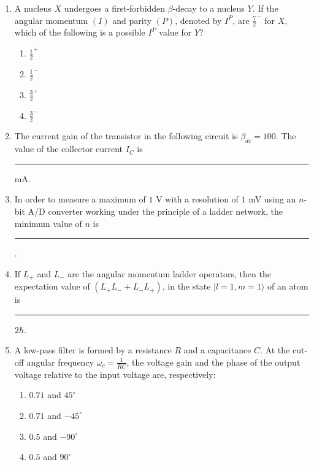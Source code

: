 \documentclass[journal]{IEEEtran}
\begin{document}
\begin{enumerate}
    
    \item A nucleus $X$ undergoes a first-forbidden $\beta$-decay to a nucleus $Y$. If the angular momentum $(I)$ and parity $(P)$, denoted by $I^P$, are $\frac{7}{2}^-$ for $X$, which of the following is a possible $I^P$ value for $Y$?
    
    \begin{multicols}{4}
    \begin{enumerate}
        \item $\frac{1}{2}^+$
        \item $\frac{1}{2}^-$
        \item $\frac{3}{2}^+$
        \item $\frac{3}{2}^-$
    \end{enumerate}
    \end{multicols}

        
    \item The current gain of the transistor in the following circuit is $\beta_{dc} = 100$. The value of the collector current $I_C$ is \rule{1cm}{0.15mm} mA.

    

    
    \item In order to measure a maximum of $1$ V with a resolution of $1$ mV using an $n$-bit A/D converter working under the principle of a ladder network, the minimum value of $n$ is \rule{1cm}{0.15mm}.

    
    \item If $L_+$ and $L_-$ are the angular momentum ladder operators, then the expectation value of $(L_+ L_- + L_- L_+)$, in the state $|l=1, m=1\rangle$ of an atom is \rule{1cm}{0.15mm} $2\hbar$.

    
    \item A low-pass filter is formed by a resistance $R$ and a capacitance $C$. At the cut-off angular frequency $\omega_c = \frac{1}{RC}$, the voltage gain and the phase of the output voltage relative to the input voltage are, respectively:
    
    \begin{multicols}{4}
    \begin{enumerate}
        \item $0.71$ and $45^\circ$
        \item $0.71$ and $-45^\circ$
        \item $0.5$ and $-90^\circ$
        \item $0.5$ and $90^\circ$
    \end{enumerate}
    \end{multicols}

\end{enumerate}
\end{document}
